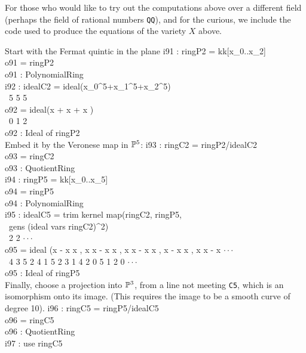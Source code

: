 {}For those who would like to try out the
computations above over a different field (perhaps the
{}field of rational numbers {\tt QQ}),
and for the curious, we include the code
used to produce the equations of the variety $X$ above.

Start with the Fermat quintic in the plane
\beginOutput
i91 : ringP2 = kk[x_0..x_2]\\
\emptyLine
o91 = ringP2\\
\emptyLine
o91 : PolynomialRing\\
\endOutput
\beginOutput
i92 : idealC2 = ideal(x_0^5+x_1^5+x_2^5)\\
\emptyLine
\             5    5    5\\
o92 = ideal(x  + x  + x )\\
\             0    1    2\\
\emptyLine
o92 : Ideal of ringP2\\
\endOutput
Embed it by the Veronese map in $\P^5$:
\beginOutput
i93 : ringC2 = ringP2/idealC2\\
\emptyLine
o93 = ringC2\\
\emptyLine
o93 : QuotientRing\\
\endOutput
\beginOutput
i94 : ringP5 = kk[x_0..x_5]\\
\emptyLine
o94 = ringP5\\
\emptyLine
o94 : PolynomialRing\\
\endOutput
\beginOutput
i95 : idealC5 = trim kernel map(ringC2, ringP5, \\
\              gens (ideal vars ringC2)^2)\\
\emptyLine
\              2                                    2                   $\cdot\cdot\cdot$\\
o95 = ideal (x  - x x , x x  - x x , x x  - x x , x  - x x , x x  - x  $\cdot\cdot\cdot$\\
\              4    3 5   2 4    1 5   2 3    1 4   2    0 5   1 2    0 $\cdot\cdot\cdot$\\
\emptyLine
o95 : Ideal of ringP5\\
\endOutput
{}Finally, choose a projection into $\P^3$, from a line not meeting
{\tt C5}, which is an isomorphism
onto its image. (This requires the image to be a smooth curve
of degree 10).
\beginOutput
i96 : ringC5 = ringP5/idealC5\\
\emptyLine
o96 = ringC5\\
\emptyLine
o96 : QuotientRing\\
\endOutput
\beginOutput
i97 : use ringC5\\

